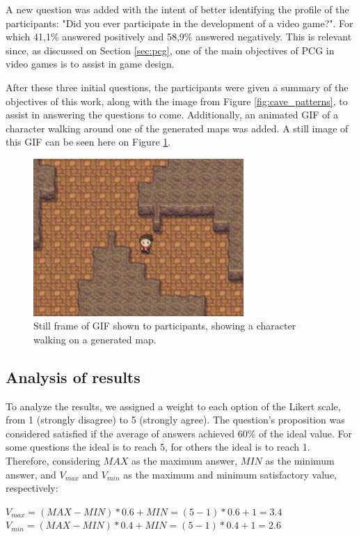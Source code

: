 A new question was added with the intent of better identifying the profile of the participants: "Did you ever participate in the development of a video game?". For which 41,1\% answered positively and 58,9\% answered negatively. This is relevant since, as discussed on Section \ref{sec:pcg}, one of the main objectives of PCG in video games is to assist in game design.

After these three initial questions, the participants were given a summary of the objectives of this work, along with the image from Figure \ref{fig:cave_patterns}, to assist in answering the questions to come. Additionally, an animated GIF of a character walking around one of the generated maps was added. A still image of this GIF can be seen here on Figure \ref{fig:gif}.

\begin{figure}[h]
    \caption{Still frame of GIF shown to participants, showing a character walking on a generated map.}
    \centerline{\includegraphics[width=8cm]{images/survey/gif.png}}
    \label{fig:gif}
\end{figure}

\subsection{Analysis of results}

To analyze the results, we assigned a weight to each option of the Likert scale, from 1 (strongly disagree) to 5 (strongly agree). The question's proposition was considered satisfied if the average of answers achieved 60\% of the ideal value. For some questions the ideal is to reach 5, for others the ideal is to reach 1. Therefore, considering \(MAX\) as the maximum answer, \(MIN\) as the minimum answer, and \(V_{max}\) and \(V_{min}\) as the maximum and minimum satisfactory value, respectively:

\begin{center}
\(V_{max} = (MAX - MIN) * 0.6 + MIN = (5 - 1) * 0.6 + 1= 3.4\)
\(V_{min} = (MAX - MIN) * 0.4 + MIN = (5 - 1) * 0.4 + 1 = 2.6\)
\end{center}


